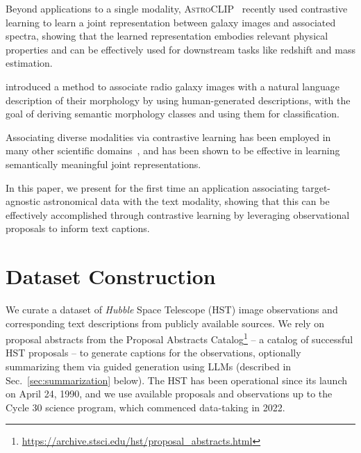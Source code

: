 \documentclass[10pt]{article} %
\newcommand{\hubble}{\emph{Hubble}\xspace}
\begin{document}
Beyond applications to a single modality, \textsc{AstroCLIP}~\citep{lanusse2023astroclip} recently used contrastive learning to learn a joint representation between galaxy images and associated spectra, showing that the learned representation embodies relevant physical properties and can be effectively used for downstream tasks like redshift and mass estimation.
%

\citet{bowles2023radio,bowles2022new} introduced a method to associate radio galaxy images with a natural language description of their morphology by using human-generated descriptions, with the goal of deriving semantic morphology classes and using them for classification.

%
Associating diverse modalities via contrastive learning has been employed in many other scientific domains~\citep[e.g.,][]{liu2023text,Sanchez-Fernandez2022.11.17.516915,lanusse2023astroclip,cepeda2023geoclip}, and has been shown to be effective in learning semantically meaningful joint representations.


In this paper, we present for the first time an application associating target-agnostic astronomical data with the text modality, showing that this can be effectively accomplished through contrastive learning by leveraging observational proposals to inform text captions.
%


\section{Dataset Construction}
\label{sec:dataset}

We curate a dataset of \hubble Space Telescope (HST) image observations and corresponding text descriptions from publicly available sources.
%
We rely on proposal abstracts from the Proposal Abstracts Catalog\footnote{\url{https://archive.stsci.edu/hst/proposal_abstracts.html}} -- a catalog of successful HST proposals -- to generate captions for the observations, optionally summarizing them via guided generation using LLMs (described in Sec.~\ref{sec:summarization} below).
%
The HST has been operational since its launch on April 24, 1990, and we use available proposals and observations up to the Cycle 30 science program, which commenced data-taking in 2022.
%
\end{document}
